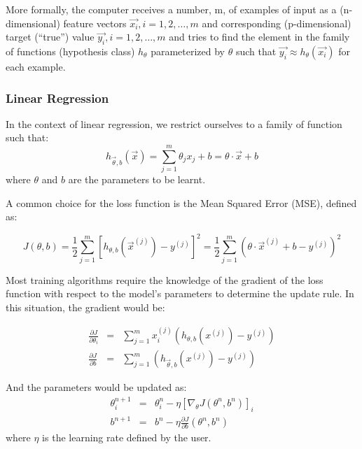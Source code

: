 More formally, the computer receives a number, m, of examples of input as a (n-dimensional) feature vectors $\vec{x_i}, i = 1,2, \ldots ,m$ and corresponding (p-dimensional) target (“true”) value $\vec{ y_i}, i=1,2, \ldots ,m$ and tries to find the element in the family of functions (hypothesis class) $h_{\theta}$ parameterized by $\theta$ such that $\vec{ y_i}  \approx h_\theta \left(\vec {x_i} \right)$ for each example. 

\subsubsection{Linear Regression}
\label{subsubsec:linear-regression}
In the context of linear regression, we restrict ourselves to a family of function such that:
\begin{equation}
h_{\vec{\theta},b} ( \vec{x} ) = \sum_{j = 1}^{m} \theta_j x_j + b = \theta \cdot \vec{x} + b
\end{equation}
where $\theta$ and $b$ are the parameters to be learnt.

A common choice for the loss function is the Mean Squared Error (MSE), defined as:

\begin{equation}
J \left( \theta , b\right) = \frac{1}{2} \sum_{j=1}^m \left[ h_{\theta,b} \left( \vec{x}^{(j)} \right) -  y^{(j)} \right]^2 =  \frac{1}{2} \sum_{j=1}^m \left( \theta \cdot \vec{x}^{(j)} + b - y ^{(j)} \right) ^2
\label{eq:MSE-definition}
\end{equation}

Most training algorithms require the knowledge of the gradient of the loss function with respect to the model's parameters to determine the update rule. In this situation, the gradient would be:

\begin{eqnarray}
\frac{ \partial J}{\partial \theta_i } &=& \sum _{j= 1}^m x_i^{(j)} (  h_{\theta, b} ( x^{(j)}) - y^{(j)} ) \\
\frac{ \partial J}{\partial b } &=&  \sum _{j= 1}^m (  h_{\vec{\theta}, b} ( x^{(j)}) - y^{(j)} )
\label{eq:MSE-gradient}
\end{eqnarray}

And the parameters would be updated as:
\begin{eqnarray}
\theta_i^{n+1} &=& \theta_i^{n} - \eta \left[\nabla_{\theta} J(\theta^n,b^n )\right]_i \\
b^{n+1} &=& b^n - \eta \frac{\partial J}{\partial b} \left(\theta^n,b^n \right)
\label{eq:GD-update-rule}
\end{eqnarray}
where $\eta$ is the learning rate defined by the user.


